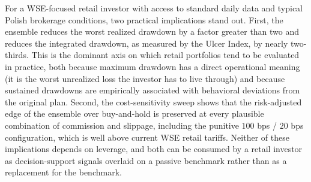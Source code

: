 \documentclass{ieeeaccess}
\begin{document}
For a WSE-focused retail investor with access to standard daily data and typical Polish brokerage conditions, two practical implications stand out. First, the ensemble reduces the worst realized drawdown by a factor greater than two and reduces the integrated drawdown, as measured by the Ulcer Index, by nearly two-thirds. This is the dominant axis on which retail portfolios tend to be evaluated in practice, both because maximum drawdown has a direct operational meaning (it is the worst unrealized loss the investor has to live through) and because sustained drawdowns are empirically associated with behavioral deviations from the original plan. Second, the cost-sensitivity sweep shows that the risk-adjusted edge of the ensemble over buy-and-hold is preserved at every plausible combination of commission and slippage, including the punitive $100$ bps / $20$ bps configuration, which is well above current WSE retail tariffs. Neither of these implications depends on leverage, and both can be consumed by a retail investor as decision-support signals overlaid on a passive benchmark rather than as a replacement for the benchmark.
\end{document}
